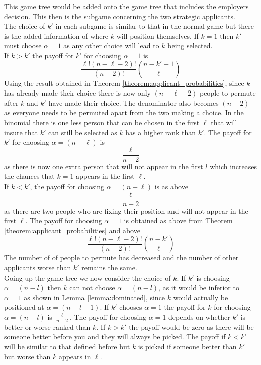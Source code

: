 \documentclass{article}
\begin{document}
\begin{figure}[H]
{\begin{tikzpicture}
  
\end{tikzpicture}}
\end{figure}

This game tree would be added onto the game tree that includes the employers decision. This then is the subgame concerning the two strategic applicants. 
\\[2ex]
The choice of $k'$ in each subgame is similar to that in the normal game but there is the added information of where $k$ will position themselves. If $k=1$ then $k'$ must choose $\alpha=1$ as any other choice will lead to $k$ being selected.
\\[2ex]
If $k>k'$ the payoff for $k'$ for choosing $\alpha=1$ is 
$$\frac{\ell!(n-\ell-2)!}{(n-2)!}\binom{n-k'-1}{\ell}$$
Using the result obtained in Theorem \ref{theorem:applicant_probabilities}, since $k$ has already made their choice there is now only $(n-\ell-2)$ people to permute after $k$ and $k'$ have made their choice. The denominator also becomes $(n-2)$ as everyone needs to be permuted apart from the two making a choice. In the binomial there is one less person that can be chosen in the first $\ell$ that will insure that $k'$ can still be selected as $k$ has a higher rank than $k'$. The payoff for $k'$ for choosing $\alpha=(n-\ell)$ is 
$$\frac{\ell}{n-2}$$
as there is now one extra person that will not appear in the first $l$ which increases the chances that $k=1$ appears in the first $\ell$.
\\[2ex]
If $k<k'$, the payoff for choosing $\alpha=(n-\ell)$ is as above $$\frac{\ell}{n-2}$$
as there are two people who are fixing their position and will not appear in the first $\ell$. The payoff for choosing $\alpha=1$ is obtained as above from Theorem \ref{theorem:applicant_probabilities} and above
$$\frac{\ell!(n-\ell-2)!}{(n-2)!}\binom{n-k'}{\ell}$$
The number of of people to permute has decreased and the number of other applicants worse than $k'$ remains the same.
\\[2ex]
Going up the game tree we now consider the choice of $k$. If $k'$ is choosing $\alpha=(n-l)$ then $k$ can not choose $\alpha=(n-l)$, as it would be inferior to $\alpha=1$ as shown in Lemma \ref{lemma:dominated}, since $k$ would actually be positioned at $\alpha=(n-l-1)$. If $k'$ chooses $\alpha=1$ the payoff for $k$ for choosing $\alpha=(n-l)$ is $\frac{\ell}{n-2}$. The payoff for choosing $\alpha=1$ depends on whether $k'$ is better or worse ranked than $k$. If $k>k'$ the payoff would be zero as there will be someone better before you and they will always be picked. The payoff if $k<k'$ will be similar to that defined before but $k$ is picked if someone better than $k'$ but worse than $k$ appears in $\ell$.
\end{document}
